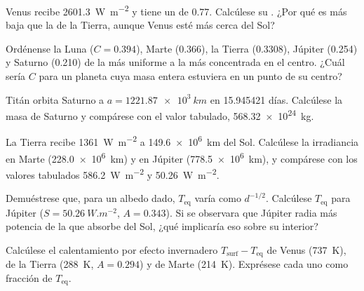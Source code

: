 \begin{exercise}[$\star$]\label{exo:b1:comparative-planetology:3}
Venus recibe \qty{2601.3}{W.m^{-2}} y tiene un  de 0.77. Calcúlese su . ¿Por qué es más baja que la de la Tierra, aunque Venus esté más cerca del Sol?
\end{exercise}

\begin{exercise}[$\star$]\label{exo:b1:comparative-planetology:4}
Ordénense la Luna ($C = 0.394$), Marte (0.366), la Tierra (0.3308), Júpiter (0.254) y Saturno
(0.210) de la más uniforme a la más concentrada en el centro. ¿Cuál sería $C$ para un planeta
cuya masa entera estuviera en un punto de su centro?
\end{exercise}

\begin{exercise}[$\star\star$]\label{exo:b1:comparative-planetology:5}
Titán orbita Saturno a $a = \qty{1221.87e3}{km}$ en \num{15.945421} días. Calcúlese la masa de
Saturno y compárese con el valor tabulado, \qty{568.32e24}{kg}.
\end{exercise}

\begin{exercise}[$\star\star$]\label{exo:b1:comparative-planetology:6}
La Tierra recibe \qty{1361}{W.m^{-2}} a \qty{149.6e6}{km} del Sol. Calcúlese la irradiancia en
Marte (\qty{228.0e6}{km}) y en Júpiter (\qty{778.5e6}{km}), y compárese con los valores tabulados
\qty{586.2}{W.m^{-2}} y \qty{50.26}{W.m^{-2}}.
\end{exercise}

\begin{exercise}[$\star\star$]\label{exo:b1:comparative-planetology:7}
Demuéstrese que, para un albedo dado, $T_\mathrm{eq}$ varía como $d^{-1/2}$. Calcúlese
$T_\mathrm{eq}$ para Júpiter ($S = \qty{50.26}{W.m^{-2}}$, $A = 0.343$). Si se observara que
Júpiter radia más potencia de la que absorbe del Sol, ¿qué implicaría eso sobre su interior?
\end{exercise}

\begin{exercise}[$\star\star$]\label{exo:b1:comparative-planetology:8}
Calcúlese el calentamiento por efecto invernadero $T_\mathrm{surf} - T_\mathrm{eq}$ de Venus
(\qty{737}{K}), de la Tierra (\qty{288}{K}, $A = 0.294$) y de Marte (\qty{214}{K}). Exprésese
cada uno como fracción de $T_\mathrm{eq}$.
\end{exercise}

